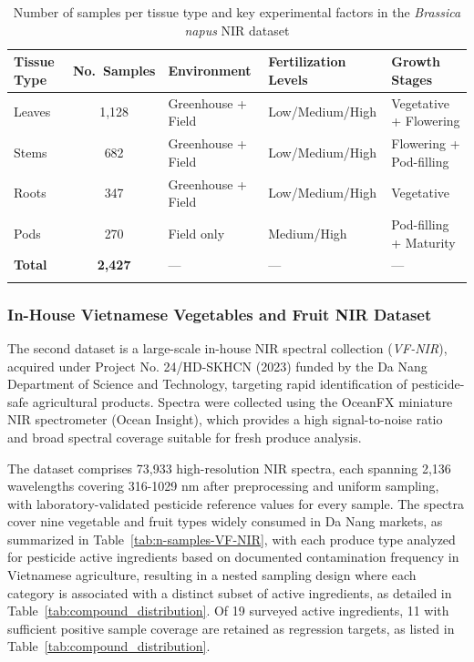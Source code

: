 \documentclass[pdflatex,sn-mathphys-num]{sn-jnl}%
\begin{document}
\begin{table}[t]
    \caption{Number of samples per tissue type and key experimental factors in the \textit{Brassica napus} NIR dataset}
    \label{tab:n-samples-brassica-napus}
    \centering
    \begin{tabularx}{\linewidth}{l c X X X}
    \toprule
    Tissue Type & No.\ Samples & Environment & Fertilization Levels & Growth Stages \\
    \midrule
    Leaves
    & 1{,}128
    & Greenhouse + Field
    & Low/Medium/High
    & Vegetative + Flowering \\
    
    Stems
    & 682
    & Greenhouse + Field
    & Low/Medium/High
    & Flowering + Pod-filling \\
    
    Roots
    & 347
    & Greenhouse + Field
    & Low/Medium/High
    & Vegetative \\
    
    Pods
    & 270
    & Field only
    & Medium/High
    & Pod-filling + Maturity \\
    \midrule
    \textbf{Total}
    & \textbf{2{,}427}
    & ---
    & ---
    & --- \\
    \botrule
    \end{tabularx}
\end{table}

\subsubsection{In-House Vietnamese Vegetables and Fruit NIR Dataset}
The second dataset is a large-scale in-house NIR spectral collection (\textit{VF-NIR}), acquired under Project No. 24/HD-SKHCN (2023) funded by the Da Nang Department of Science and Technology, targeting rapid identification of pesticide-safe agricultural products. Spectra were collected using the OceanFX miniature NIR spectrometer (Ocean Insight), which provides a high signal-to-noise ratio and broad spectral coverage suitable for fresh produce analysis.

The dataset comprises 73,933 high-resolution NIR spectra, each spanning 2,136 wavelengths covering 316-1029 nm after preprocessing and uniform sampling, with laboratory-validated pesticide reference values for every sample. The spectra cover nine vegetable and fruit types widely consumed in Da Nang markets, as summarized in Table~\ref{tab:n-samples-VF-NIR}, with each produce type analyzed for pesticide active ingredients based on documented contamination frequency in Vietnamese agriculture, resulting in a nested sampling design where each category is associated with a distinct subset of active ingredients, as detailed in Table~\ref{tab:compound_distribution}. Of 19 surveyed active ingredients, 11 with sufficient positive sample coverage are retained as regression targets, as listed in Table~\ref{tab:compound_distribution}.
\end{document}
